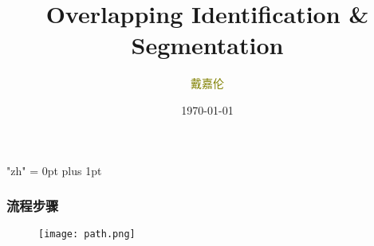 \documentclass[notheorems,mathserif,table,compress]{beamer}  %
\begin{document}
\XeTeXlinebreaklocale "zh"         %
\XeTeXlinebreakskip = 0pt plus 1pt %
\begin{comment}
\AtBeginSection[]{                              %
  \frame<handout:0>{
    \frametitle{Content}\small
    \tableofcontents[current,currentsubsection]
  }
}
\AtBeginSubsection[]                            %
{
  \frame<handout:0>                             %
  {
    \frametitle{下一节内容}\small
    \tableofcontents[current,currentsubsection] %
  }
}
\end{comment}
\title[]{Overlapping Identification \& Segmentation}
\author[戴嘉伦]{\textcolor{olive}{戴嘉伦}}
\institute[中国海洋大学]{\small\textcolor{violet}{中国海洋大学}}
\date{\today}
\frame{ \titlepage }


\begin{frame}
  \frametitle{流程步骤}
   \begin{figure}[!ht]
   \centering
   \texttt{[image: path.png]}
   \end{figure}
\end{frame}
\end{document}
